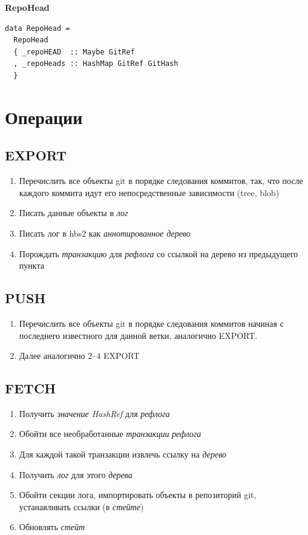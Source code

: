 \documentclass[11pt,a4paper]{article}
\newcommand{\term}[2]{\textit{#2}}
\begin{document}
\textbf{RepoHead}

\begin{lstlisting}
data RepoHead =
  RepoHead
  { _repoHEAD  :: Maybe GitRef
  , _repoHeads :: HashMap GitRef GitHash
  }
\end{lstlisting}


\section{Операции}

\subsection{EXPORT}

\begin{enumerate}
  \item Перечислить все объекты git в порядке следования коммитов, так, что после каждого коммита
           идут его непосредственные зависимости (tree, blob)
  \item Писать данные объекты в \term{log}{лог}
  \item Писать лог в hbs2 как \term{ann-merkle-tree}{аннотированное дерево}
  \item Порождать \term{reflog-tran}{транзакцию} для \term{reflog}{рефлога} со ссылкой на дерево из
    предыдущего пункта
\end{enumerate}

\subsection{PUSH}

\begin{enumerate}
  \item Перечислить все объекты git в порядке следования коммитов начиная с последнего известного
    для данной ветки, аналогично EXPORT.
  \item Далее аналогично 2--4 EXPORT
\end{enumerate}

\subsection{FETCH}

\begin{enumerate}
  \item Получить \term{hashref}{значение HashRef} для \term{reflog}{рефлога}
  \item Обойти все необработанные \term{transaction}{транзакции} \term{reflog}{рефлога}
  \item Для каждой такой транзакции извлечь ссылку на \term{merkle-tree}{дерево}
  \item Получить \term{log}{лог} для этого \term{merkle-tree}{дерева}
  \item Обойти секции лога, импортировать объекты в репозиторий git, устанавливать
        ссылки (в \term{state}{стейте})
  \item Обновлять \term{state}{стейт}
\end{enumerate}
\end{document}
